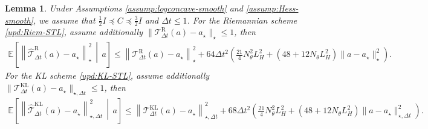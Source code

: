 \documentclass[11pt]{article}
\theoremstyle{plain}
\newtheorem{lemma}[theorem]{Lemma}
\theoremstyle{definition}
\theoremstyle{remark}
\newcommand{\E}{\mathbb{E}}
\begin{document}
\begin{lemma}\label{lem:STL-one-step}
    Under Assumptions \ref{assump:logconcave-smooth} and \ref{assump:Hess-smooth}, we assume that $\frac{1}{2}I \preceq C \preceq \frac{3}{2}I$ and $\Delta t \leq 1$.
    For the Riemannian scheme \eqref{upd:Riem-STL}, assume additionally $\| \mathcal{T}_{\Delta t}^{\mathrm R}(a)-a_\star\|_\star \leq 1$, then
    \begin{align*}
        \E\left[
            \left\|
                \widehat{\mathcal{T}}_{\Delta t}^{\mathrm R}(a)-a_\star
            \right\|_\star^2
            \,\middle|\,a
        \right] \leq
        \left\|
            \mathcal{T}_{\Delta t}^{\mathrm R}(a)-a_\star
        \right\|_\star^2
        +
        64\Delta t^2
        \left(
            \frac{21}{4}N_\theta^2L_H^2
            +
            (48+12N_\theta L_H^2)\|a-a_\star\|_\star^2
        \right).
    \end{align*}
    For the KL scheme \eqref{upd:KL-STL}, assume additionally
        $\| \mathcal{T}_{\Delta t}^{\mathrm{KL}}(a)-a_\star\|_{\star,\Delta t} \leq 1$, then
    \begin{align*}
        \E\left[
            \left\|
                \widehat{\mathcal{T}}_{\Delta t}^{\mathrm{KL}}(a)-a_\star
            \right\|_{\star,\Delta t}^2
            \,\middle|\,a
        \right] \leq
        \left\|
            \mathcal{T}_{\Delta t}^{\mathrm{KL}}(a)-a_\star
        \right\|_{\star,\Delta t}^2
        +
        68\Delta t^2
        \left(
            \frac{21}{4}N_\theta^2L_H^2
            +
            (48+12N_\theta L_H^2)\|a-a_\star\|_{\star,\Delta t}^2
        \right).
    \end{align*}
\end{lemma}
\end{document}
